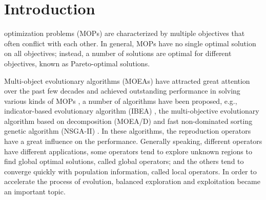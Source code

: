 \documentclass[journal]{IEEEtran}
\begin{document}
\section{Introduction}

 optimization problems (MOPs) are characterized by multiple objectives that often conflict with each other\cite{zhang2014efficient}. In general, MOPs have no single optimal solution on all objectives; instead, a number of solutions are optimal for different objectives, known as Pareto-optimal solutions.

Multi-object evolutionary algorithms (MOEAs) have attracted great attention over the past few decades and achieved outstanding performance in solving various kinds of MOPs \cite{fialho2010adaptive},
a number of algorithms have been proposed, e.g., indicator-based evolutionary algorithm (IBEA) \cite{IBEA}, the multi-objective evolutionary algorithm based on decomposition (MOEA/D) \cite{moead} and fast non-dominated sorting genetic algorithm (NSGA-II) \cite{nsga2}.
In these algorithms, the reproduction operators have a great influence on the performance.
Generally speaking, different operators have different applications, some operators tend to explore unknown regions to find global optimal solutions, called global operators; and the others tend to converge quickly with population information, called local operators.
In order to accelerate the process of evolution, balanced exploration and exploitation became an important topic.
\end{document}
